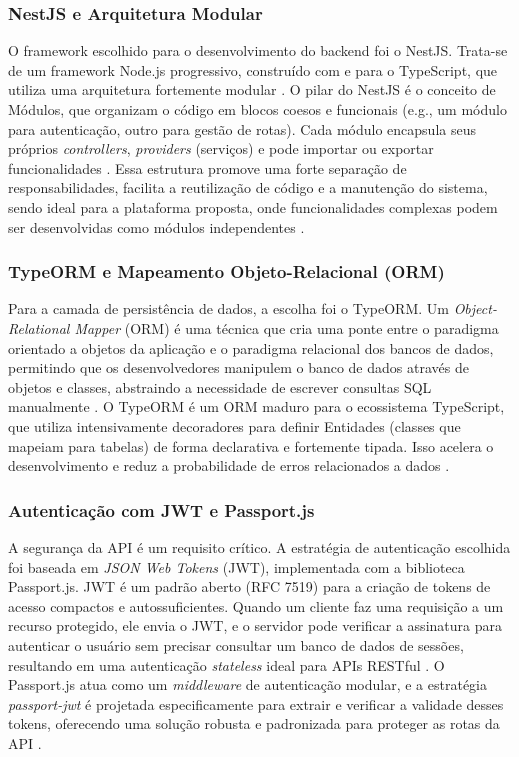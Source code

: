 \subsubsection{NestJS e Arquitetura Modular}
O framework escolhido para o desenvolvimento do backend foi o NestJS. Trata-se de um framework Node.js progressivo, construído com e para o TypeScript, que utiliza uma arquitetura fortemente modular \cite{nestjs2025framework}. O pilar do NestJS é o conceito de Módulos, que organizam o código em blocos coesos e funcionais (e.g., um módulo para autenticação, outro para gestão de rotas). Cada módulo encapsula seus próprios \textit{controllers}, \textit{providers} (serviços) e pode importar ou exportar funcionalidades \cite{nestjs2025modules}. Essa estrutura promove uma forte separação de responsabilidades, facilita a reutilização de código e a manutenção do sistema, sendo ideal para a plataforma proposta, onde funcionalidades complexas podem ser desenvolvidas como módulos independentes \cite{devanddeliver2024architecture}.

\subsubsection{TypeORM e Mapeamento Objeto-Relacional (ORM)}
Para a camada de persistência de dados, a escolha foi o TypeORM. Um \textit{Object-Relational Mapper} (ORM) é uma técnica que cria uma ponte entre o paradigma orientado a objetos da aplicação e o paradigma relacional dos bancos de dados, permitindo que os desenvolvedores manipulem o banco de dados através de objetos e classes, abstraindo a necessidade de escrever consultas SQL manualmente \cite{logrocket2024typeorm}. O TypeORM é um ORM maduro para o ecossistema TypeScript, que utiliza intensivamente decoradores para definir Entidades (classes que mapeiam para tabelas) de forma declarativa e fortemente tipada. Isso acelera o desenvolvimento e reduz a probabilidade de erros relacionados a dados \cite{devto2024typeorm}.

\subsubsection{Autenticação com JWT e Passport.js}
A segurança da API é um requisito crítico. A estratégia de autenticação escolhida foi baseada em \textit{JSON Web Tokens} (JWT), implementada com a biblioteca Passport.js. JWT é um padrão aberto (RFC 7519) para a criação de tokens de acesso compactos e autossuficientes. Quando um cliente faz uma requisição a um recurso protegido, ele envia o JWT, e o servidor pode verificar a assinatura para autenticar o usuário sem precisar consultar um banco de dados de sessões, resultando em uma autenticação \textit{stateless} ideal para APIs RESTful \cite{soshace2024jwt}. O Passport.js atua como um \textit{middleware} de autenticação modular, e a estratégia \textit{passport-jwt} é projetada especificamente para extrair e verificar a validade desses tokens, oferecendo uma solução robusta e padronizada para proteger as rotas da API \cite{passportjs2025jwt}.

